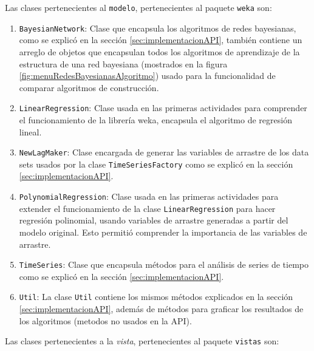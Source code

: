 Las clases pertenecientes al \texttt{modelo}, pertenecientes al paquete \texttt{weka} son:

\renewcommand{\labelenumi}{$\bullet$ }
\begin{enumerate}
	\item \texttt{BayesianNetwork}: Clase que encapsula los algoritmos de redes bayesianas, como se explicó en la sección \ref{sec:implementacionAPI}, también contiene un arreglo de objetos que encapsulan todos los algoritmos de aprendizaje de  la estructura de una red bayesiana (mostrados en la figura \ref{fig:menuRedesBayesianasAlgoritmo}) usado para la funcionalidad de comparar algoritmos de construcción.
	
	\item \texttt{LinearRegression}: Clase usada en las primeras actividades para comprender el funcionamiento de la librería weka, encapsula el algoritmo de regresión lineal.
	
	\item \texttt{NewLagMaker}: Clase encargada de generar las variables de arrastre de los data sets usados por la clase \texttt{TimeSeriesFactory} como se explicó en la sección \ref{sec:implementacionAPI}.
	
	\item \texttt{PolynomialRegression}: Clase usada en las primeras actividades para extender el funcionamiento de la clase \texttt{LinearRegression} para hacer regresión polinomial, usando variables de arrastre generadas a partir del modelo original. Esto permitió comprender la importancia de las variables de arrastre. %
	
	\item \texttt{TimeSeries}: Clase que encapsula métodos para el análisis de series de tiempo como se explicó en la sección \ref{sec:implementacionAPI}.
	
	\item \texttt{Util}: La clase \texttt{Util} contiene los mismos métodos explicados en la sección \ref{sec:implementacionAPI}, además de métodos para graficar los resultados de los algoritmos (metodos no usados en la API).	
\end{enumerate}

Las clases pertenecientes a la \textit{vista}, pertenecientes al paquete \texttt{vistas} son:

